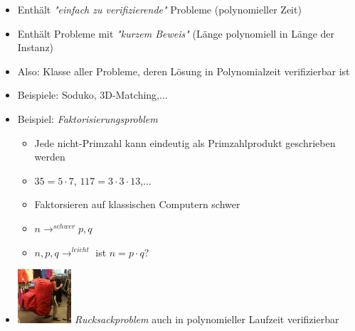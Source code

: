 \documentclass[
    ngerman,
    color=3b,
    dark_mode,
    load_common, %
    summary,
    boxarc,
]{rubos-tuda-template}
\begin{document}
\begin{definition}[Klasse NP]\mbox{}
      \begin{itemize}
            \item Enthält \textit{\string"einfach zu verifizierende\string"} Probleme (polynomieller Zeit)
            \item Enthält Probleme mit \textit{\string"kurzem Beweis\string"} (Länge polynomiell in Länge der Instanz)
            \item Also: Klasse aller Probleme, deren Lösung in Polynomialzeit verifizierbar ist
      \end{itemize}
\end{definition}
\begin{itemize}

      \item Beispiele: Soduko, 3D-Matching,...
      \item Beispiel: \textit{Faktorisierungsproblem}
            \begin{itemize}
                  \item Jede nicht-Primzahl kann eindeutig als Primzahlprodukt geschrieben werden
                  \item $35 = 5 \cdot 7$, $117 = 3 \cdot 3 \cdot 13$,...
                  \item Faktorsieren auf klassischen Computern schwer
                  \item $n \longrightarrow^{schwer} p,q$
                  \item $n,p,q \longrightarrow^{leicht}$ ist $n = p \cdot q?$
            \end{itemize}
      \item \includegraphics[width=2cm]{pictures/rucksackproblem.png} \textit{Rucksackproblem} auch in polynomieller Laufzeit verifizierbar
\end{itemize}
\clearpage
\end{document}
